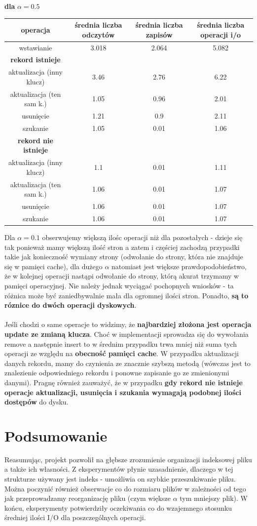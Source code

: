 \documentclass{article}
\begin{document}
\begin{center}
\textbf{dla} $\alpha = 0.5$ \\
\begin{tabular}{ c | c c | c}
 operacja &średnia liczba odczytów & średnia liczba zapisów & średnia liczba operacji i/o \\ 
\hline
 wstawianie & 3.018 & 2.064 & 5.082 \\  
 \hline 
 \textbf{rekord istnieje}\\
 aktualizacja (inny klucz) & 3.46 & 2.76 & 6.22 \\
 aktualizacja (ten sam k.) & 1.05 & 0.96 & 2.01 \\
 usunięcie & 1.21 & 0.9 & 2.11 \\
 szukanie & 1.05 & 0.01 & 1.06\\
 \hline
 \textbf{rekord nie istnieje} \\
 aktualizacja (inny klucz) & 1.1 & 0.01 & 1.11 \\ 
 aktualizacja (ten sam k.) & 1.06 & 0.01 & 1.07 \\
 usunięcie & 1.06 & 0.01 & 1.07\\
 szukanie & 1.06 & 0.01 & 1.07 \\
\hline \hline 
\end{tabular}
\end{center}
Dla $\alpha=0.1$ obserwujemy większą ilośc operacji niż dla pozostałych - dzieje się tak ponieważ mamy większą ilość stron a zatem i częściej zachodzą przypadki takie jak konieczność wymiany strony (odwołanie do strony, która nie znajduje się w pamięci cache), dla dużego $\alpha$ natomiast jest większe prawdopodobieństwo, że w kolejnej operacji nastąpi odwołanie do strony, którą akurat trzymamy w pamięci operacyjnej.  Nie należy jednak wyciągać pochopnych wniosków - ta różnica może być zaniedbywalnie mała dla ogromnej ilości stron.  Ponadto, \textbf{są to róznice do dwóch operacji dyskowych}. \\\\
Jeśli chodzi o same operacje to widzimy, że\textbf{ najbardziej złożona jest operacja update ze zmianą klucza}.
Choć w implementacji sprowadza się do wywołania remove a następnie insert to w średnim przypadku trwa mniej niż suma tych operacji ze względu na \textbf{obecność pamięci cache}.  W przypadku aktualizacji danych rekordu, mamy do czynienia ze znacznie szybszą metodą (wówczas jest to znalezienie odpowiedniego rekordu i ponowne zapisanie go ze zmienionymi danymi).  Pragnę również zauważyć, że w przypadku \textbf{gdy rekord nie istnieje operacje aktualizacji, usunięcia i szukania wymagają podobnej ilości dostępów} do dysku.
\section{Podsumowanie}
Reasumując, projekt pozwolił na głębsze zrozumienie organizacji indeksowej pliku a także ich własności. 
Z eksperymentów płynie uzasadnienie,  dlaczego w tej strukturze używany jest indeks - umożliwia on szybkie przeszukiwanie pliku. Można poczynić również obserwacje co do rozmiaru plików w zależności od tego jak przeprowadzamy reorganizację pliku (czym większe $\alpha$ tym mniejszy plik). W końcu, eksperymenty potwierdziły oczekiwania co do wzajemnego stosunku średniej ilości I/O dla poszczególnych operacji.
\end{document}
